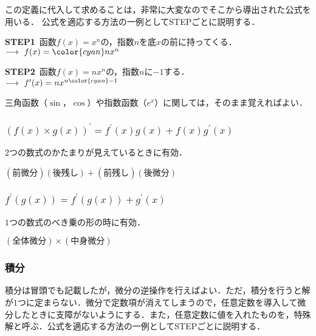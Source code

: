 \documentclass[a4paper,11pt]{ltjsarticle}
\begin{document}
この定義に代入して求めることは，非常に大変なのでそこから導出された公式を用いる．
公式を適応する方法の一例としてSTEPごとに説明する．


\textbf{STEP1}\ 函数$f(x)=x^{n}$の，指数$n$を底$x$の前に持ってくる．\\
 $\longrightarrow\ f(x)={\color{cyan} n}x^{n}$


\textbf{STEP2}\ 函数$f(x)=nx^{n}$の，指数$n$に$-1$する．\\
 $\longrightarrow\ f^{\prime}(x)=nx^{n{\color{cyan} -1}}$


三角函数（$\sin$，$\cos$）や指数函数（$e^{x}$）に関しては，そのまま覚えればよい．

\clearpage

\subsubsection{$(f(x)\times g(x))^{\prime}=f^{\prime}(x)g(x)+f(x)g^{\prime}(x)$}


$2$つの数式のかたまりが見えているときに有効．

\begin{center}
  $(\text{前微分})(\text{後残し})+(\text{前残し})(\text{後微分})$
\end{center}

\subsubsection{$f^{\prime}(g(x))=f^{\prime}(g(x))+g^{\prime}(x)$}


$1$つの数式のべき乗の形の時に有効．

\begin{center}
  $(\text{全体微分}) \times (\text{中身微分})$
\end{center}

\subsubsection{積分}


積分は冒頭でも記載したが，微分の逆操作を行えばよい．ただ，積分を行うと解が$1$つに定まらない．微分で定数項が消えてしまうので，任意定数を導入して微分したときに支障がないようにする．また，任意定数に値を入れたものを，特殊解と呼ぶ．公式を適応する方法の一例としてSTEPごとに説明する．
\end{document}
